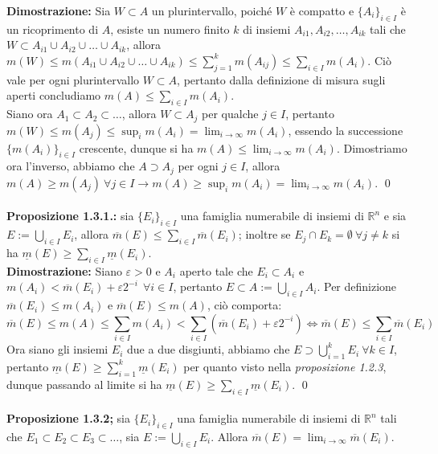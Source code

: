 \documentclass{article}
\numberwithin{equation}{subsection}
\begin{document}
\textbf{Dimostrazione:} Sia $W \subset A$ un plurintervallo, poiché $W$ è compatto e $\{ A_i \}_{i \in I}$ è un ricoprimento di $A$, esiste un numero finito $k$ di insiemi $A_{i1}, A_{i2}, \dots, A_{ik}$ tali che $W \subset A_{i1} \cup A_{i2} \cup \dots \cup A_{ik}$, allora $m(W) \leq m(A_{i1} \cup A_{i2} \cup \dots \cup A_{ik}) \leq \sum_{j = 1}^k m(A_{ij}) \leq \sum_{i \in I} m(A_i)$. Ciò vale per ogni plurintervallo $W \subset A$, pertanto dalla definizione di misura sugli aperti concludiamo $m(A) \leq \sum_{i \in I}m(A_i)$. \\
Siano ora $A_1 \subset A_2 \subset \dots$, allora $W \subset A_j$ per qualche $j \in I$, pertanto $m(W) \leq m(A_j) \leq \sup_i m(A_i) = \lim_{i \rightarrow \infty} m(A_i)$, essendo la successione $\{ m(A_i) \}_{i \in I}$ crescente, dunque si ha $m(A) \leq \lim_{i \rightarrow \infty} m(A_i)$. Dimostriamo ora l'inverso, abbiamo che $A \supset A_j$ per ogni $j \in I$, allora $m(A) \geq m(A_j) \ \forall j \in I \rightarrow m(A) \geq \sup_i m(A_i) = \lim_{i \rightarrow \infty} m(A_i)$. \qed \\ \\
\textbf{Proposizione 1.3.1.:} sia $\{ E_i \}_{i \in I}$ una famiglia numerabile di insiemi di $\mathbb{R}^n$ e sia $E := \bigcup_{i \in I} E_i$, allora $\overline{m}(E) \leq \sum_{i \in I} \overline{m}(E_i)$; inoltre se $E_j \cap E_k = \emptyset \ \forall j \neq k$ si ha $\underline{m}(E) \geq \sum_{i \in I} \underline{m}(E_i)$. \\

\textbf{Dimostrazione:} Siano $\varepsilon > 0$ e $A_i$ aperto tale che $E_i \subset A_i$ e $m(A_i) < \overline{m}(E_i) + \varepsilon2^{-i} \ \ \forall i \in I$, pertanto $E \subset A := \bigcup_{i \in I} A_i$. Per definizione $\overline{m}(E_i) \leq m(A_i)$ e $\overline{m}(E) \leq m(A)$, ciò comporta:
\begin{equation*}
    \overline{m}(E) \leq m(A) \leq \sum_{i \in I} m(A_i) < \sum_{i \in I} (\overline{m}(E_i) + \varepsilon2^{-i}) \iff \overline{m}(E) \leq \sum_{i \in I} \overline{m}(E_i) 
\end{equation*}
Ora siano gli insiemi $E_i$ due a due disgiunti, abbiamo che $E \supset \bigcup_{i = 1}^k E_i \ \forall k \in I$, pertanto $\underline{m}(E) \geq \sum_{i = 1}^k \underline{m}(E_i)$ per quanto visto nella \textit{proposizione 1.2.3}, dunque passando al limite si ha $\underline{m}(E) \geq \sum_{i \in I} \underline{m}(E_i)$. \qed \\ \\
\textbf{Proposizione 1.3.2;} sia $\{ E_i \}_{i \in I}$ una famiglia numerabile di insiemi di $\mathbb{R}^n$ tali che $E_1 \subset E_2 \subset E_3 \subset \dots$, sia $E := \bigcup_{i \in I} E_i$. Allora $\overline{m}(E) = \lim_{i \rightarrow \infty} \overline{m}(E_i)$. \\
\end{document}
